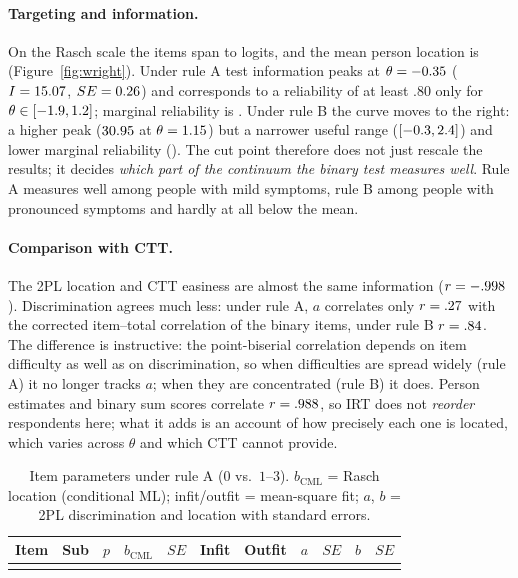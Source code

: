 \documentclass[11pt,a4paper]{article}
\begin{document}
\paragraph{Targeting and information.} On the Rasch scale the items span \BcmlMinA{} to
\BcmlMaxA{} logits, and the mean person location is \MeanPersonLocA{}
(Figure~\ref{fig:wright}). Under rule A test information peaks at
$\theta=-0.35$ ($I=15.07$, $SE=0.26$) and corresponds to a reliability
of at least .80 only for $\theta\in[-1.9, 1.2]$; marginal reliability is \MargRelA.
Under rule B the curve moves to the right: a higher peak ($30.95$ at
$\theta=1.15$) but a narrower useful range ($[-0.3, 2.4]$) and lower marginal
reliability (\MargRelB). The cut point therefore does not just rescale the results; it
decides \emph{which part of the continuum the binary test measures well}. Rule A
measures well among people with mild symptoms, rule B among people with pronounced
symptoms and hardly at all below the mean.

\paragraph{Comparison with CTT.} The 2PL location and CTT easiness are almost the same
information ($r=-.998$). Discrimination agrees much less: under rule A, $a$
correlates only $r=.27$ with the corrected item--total correlation of the binary
items, under rule B $r=.84$. The difference is instructive: the point-biserial
correlation depends on item difficulty as well as on discrimination, so when difficulties
are spread widely (rule A) it no longer tracks $a$; when they are concentrated (rule B) it
does. Person estimates and binary sum scores correlate $r=.988$, so IRT does not
\emph{reorder} respondents here; what it adds is an account of how precisely each one is
located, which varies across $\theta$ and which CTT cannot provide.

\begin{table}[t]
\centering\small
\caption{Item parameters under rule A ($0$ vs.\ $1$--$3$). $b_{\text{CML}}$ = Rasch
location (conditional ML); infit/outfit = mean-square fit; $a$, $b$ = 2PL discrimination
and location with standard errors.}
\label{tab:irtA}
\begin{tabular}{ll r rr rr rr rr}
\toprule
Item & Sub & $p$ & $b_{\text{CML}}$ & $SE$ & Infit & Outfit & $a$ & $SE$ & $b$ & $SE$\\
\midrule
\\
\bottomrule
\end{tabular}
\end{table}
\end{document}
